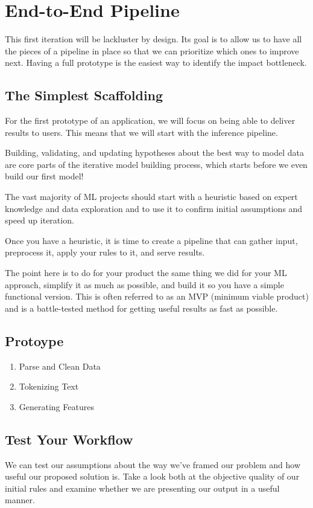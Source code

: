 \section{End-to-End Pipeline}
\noindent
This first iteration will be lackluster by design. Its goal is to
allow us to have all the pieces of a pipeline in place so that we
can prioritize which ones to improve next. Having a full prototype
is the easiest way to identify the impact bottleneck.


\subsection{The Simplest Scaffolding}
For the first prototype of an application, we will focus on being
able to deliver results to users. This means that we will start
with the inference pipeline.

Building, validating, and updating hypotheses about the best way to
model data are core parts of the iterative model building process,
which starts before we even build our first model!

The vast majority of ML projects should start with a heuristic
based on expert knowledge and data exploration and to use it
to confirm initial assumptions and speed up iteration.

Once you have a heuristic, it is time to create a pipeline that can
gather input, preprocess it, apply your rules to it, and serve
results.

The point here is to do for your product the same thing we did for
your ML approach, simplify it as much as possible, and build it so
you have a simple functional version. This is often referred to as
an MVP (minimum viable product) and is a battle-tested method for
getting useful results as fast as possible.



\subsection{Protoype}

\begin{enumerate}
    \item Parse and Clean Data
    \item Tokenizing Text
    \item Generating Features
\end{enumerate}



\subsection{Test Your Workflow}
We can test our assumptions about the way we've framed our problem
and how useful our proposed solution is. Take a look both at the
objective quality of our initial rules and examine whether we
are presenting our output in a useful manner.


